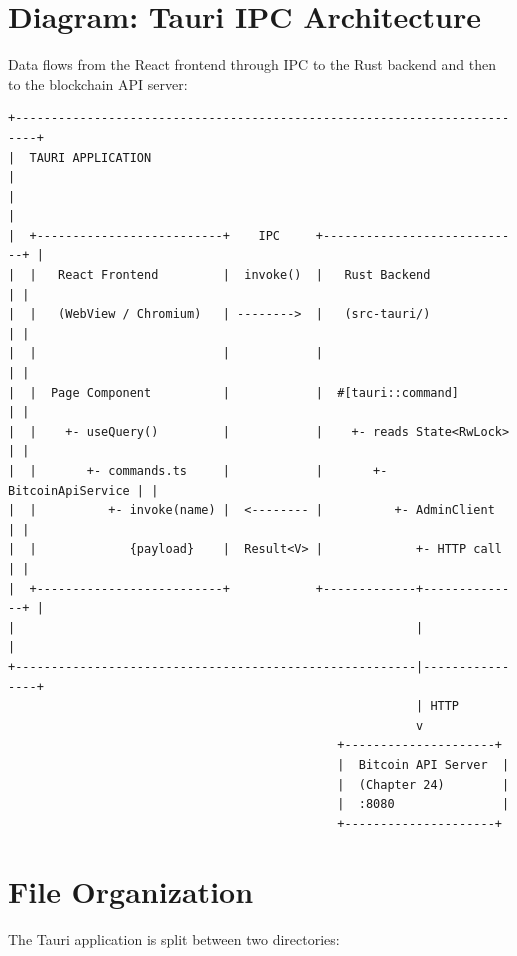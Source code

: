 \section{Diagram: Tauri IPC Architecture}
\label{sec:ch17-ipc-arch}

Data flows from the React frontend through IPC to the Rust backend and then to the blockchain API server:

\begin{verbatim}
+-------------------------------------------------------------------------+
|  TAURI APPLICATION                                                      |
|                                                                         |
|  +--------------------------+    IPC     +----------------------------+ |
|  |   React Frontend         |  invoke()  |   Rust Backend             | |
|  |   (WebView / Chromium)   | -------->  |   (src-tauri/)             | |
|  |                          |            |                            | |
|  |  Page Component          |            |  #[tauri::command]         | |
|  |    +- useQuery()         |            |    +- reads State<RwLock>  | |
|  |       +- commands.ts     |            |       +- BitcoinApiService | |
|  |          +- invoke(name) |  <-------- |          +- AdminClient    | |
|  |             {payload}    |  Result<V> |             +- HTTP call   | |
|  +--------------------------+            +-------------+--------------+ |
|                                                        |                |
+--------------------------------------------------------|----------------+
                                                         | HTTP
                                                         v
                                              +---------------------+
                                              |  Bitcoin API Server  |
                                              |  (Chapter 24)        |
                                              |  :8080               |
                                              +---------------------+
\end{verbatim}

\section{File Organization}
\label{sec:ch17-files}

The Tauri application is split between two directories:

